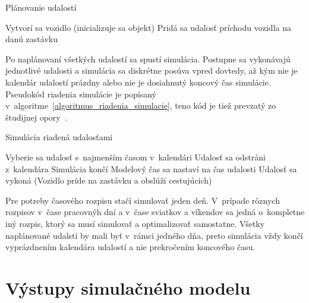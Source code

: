 \vspace*{\dimexpr0.5\baselineskip\relax}
\begin{algorithm}[H]\label{algoritmus_planovanie_udalosti}
  \caption{Plánovanie udalostí}
     {
      Vytvorí sa vozidlo (inicializuje sa objekt)\;
       {
        Pridá sa udalosť príchodu vozidla na danú zastávku\;
      }
    }
\end{algorithm}
\vspace*{\dimexpr0.5\baselineskip\relax}

Po naplánovaní všetkých udalostí sa spustí simulácia.
Postupne sa vykonávajú jednotlivé udalosti a simulácia sa diskrétne posúva vpred dovtedy, až kým nie je kalendár udalostí prázdny alebo nie je dosiahnutý koncový čas simulácie.
Pseudokód riadenia simulácie je popísaný v~algoritme~\ref{algoritmus_riadenia_simulacie}, teno kód je tiež prevzatý zo študijnej opory~\cite{peringer2022ims}.

\vspace*{\dimexpr0.5\baselineskip\relax}
\begin{algorithm}[H]\label{algoritmus_riadenia_simulacie}
\caption{Simulácia riadená udalosťami}
   {
    Vyberie sa udalosť s~najmenším časom v~kalendári\;
    Udalosť sa odstráni z~kalendára\;
     {
      Simulácia končí\;
    }
    Modelový čas sa nastaví na čas udalosti\;
    Udalosť sa vykoná (Vozidlo príde na zastávku a obslúži cestujúcich)\;
  }
\end{algorithm}
\vspace*{\dimexpr0.5\baselineskip\relax}

Pre potreby časového rozpisu stačí simulovať jeden deň.
V~prípade rôznych rozpisov v~čase pracovnýh dní a v~čase sviatkov a víkendov sa jedná o~kompletne iný rozpis, ktorý sa musí simulovať a optimalizovať samostatne.
Všetky naplánované udalsti by mali byť v~rámci jedného dňa, preto simulácia vždy končí vyprázdnením kalendára udalostí a nie prekročením koncového času.

\section{Výstupy simulačného modelu}\label{vystupy_simulacneho_modelu}

